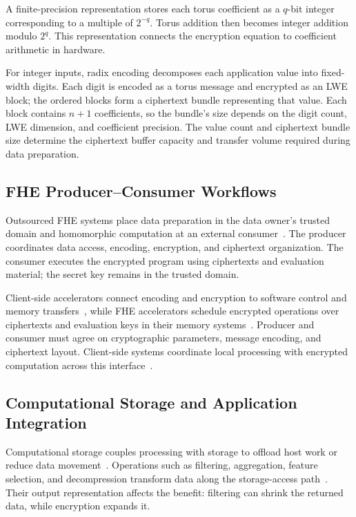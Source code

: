 \documentclass[sigconf,anonymous,balance=false]{acmart}
\newcommand{\bodypar}{\par\vskip 0pt plus 6pt\relax}
\begin{document}
A finite-precision representation stores each torus coefficient as a $q$-bit integer corresponding to a multiple of $2^{-q}$. Torus addition then becomes integer addition modulo $2^q$. This representation connects the encryption equation to coefficient arithmetic in hardware.
\bodypar

For integer inputs, radix encoding decomposes each application value into fixed-width digits. Each digit is encoded as a torus message and encrypted as an LWE block; the ordered blocks form a ciphertext bundle representing that value. Each block contains $n+1$ coefficients, so the bundle's size depends on the digit count, LWE dimension, and coefficient precision. The value count and ciphertext bundle size determine the ciphertext buffer capacity and transfer volume required during data preparation.

\subsection{FHE Producer--Consumer Workflows}
Outsourced FHE systems place data preparation in the data owner's trusted domain and homomorphic computation at an external consumer~\cite{krieger2024aloha,yune2025abcfhe,gupta2024memfhe}. The producer coordinates data access, encoding, encryption, and ciphertext organization. The consumer executes the encrypted program using ciphertexts and evaluation material; the secret key remains in the trusted domain.
\bodypar

Client-side accelerators connect encoding and encryption to software control and memory transfers~\cite{krieger2024aloha,yune2025abcfhe}, while FHE accelerators schedule encrypted operations over ciphertexts and evaluation keys in their memory systems~\cite{xu2026hera,zhou2023fhemem,vanbeirendonck2023fpt}. Producer and consumer must agree on cryptographic parameters, message encoding, and ciphertext layout. Client-side systems coordinate local processing with encrypted computation across this interface~\cite{vanderhagen2022choco}.

\subsection{Computational Storage and Application Integration}
Computational storage couples processing with storage to offload host work or reduce data movement~\cite{snia2025csmodel}. Operations such as filtering, aggregation, feature selection, and decompression transform data along the storage-access path~\cite{ruan2019insider}. Their output representation affects the benefit: filtering can shrink the returned data, while encryption expands it.
\bodypar
\end{document}
